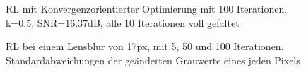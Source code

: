 \documentclass[a4paper,12pt]{article}
\begin{document}
\begin{figure}[htbp]
\caption{RL mit Konvergenzorientierter Optimierung mit 100 Iterationen, k=0.5,
SNR=16.37dB, alle 10 Iterationen voll gefaltet}%
\label{figure_konv_k150}
\end{figure}

\begin{figure}[htbp]
\caption{RL bei einem Lensblur von 17px, mit 5, 50 und 100 Iterationen.
Standardabweichungen der geänderten Grauwerte eines jeden Pixels}%
\label{figure_konv_histogramm}
\end{figure}
\end{document}
